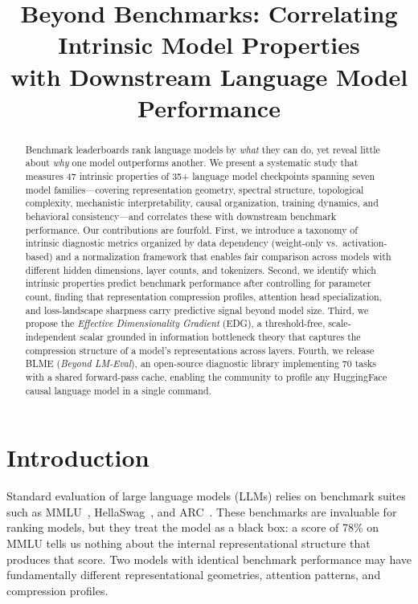 \documentclass{article}
\title{Beyond Benchmarks: Correlating Intrinsic Model Properties\\with Downstream Language Model Performance}
\author{
}
\begin{document}
\maketitle

\begin{abstract}
Benchmark leaderboards rank language models by \emph{what} they can do, yet reveal little about \emph{why} one model outperforms another.
We present a systematic study that measures 47 intrinsic properties of 35+ language model checkpoints spanning seven model families---covering representation geometry, spectral structure, topological complexity, mechanistic interpretability, causal organization, training dynamics, and behavioral consistency---and correlates these with downstream benchmark performance.
Our contributions are fourfold.
First, we introduce a taxonomy of intrinsic diagnostic metrics organized by data dependency (weight-only vs.\ activation-based) and a normalization framework that enables fair comparison across models with different hidden dimensions, layer counts, and tokenizers.
Second, we identify which intrinsic properties predict benchmark performance after controlling for parameter count, finding that representation compression profiles, attention head specialization, and loss-landscape sharpness carry predictive signal beyond model size.
Third, we propose the \emph{Effective Dimensionality Gradient} (EDG), a threshold-free, scale-independent scalar grounded in information bottleneck theory that captures the compression structure of a model's representations across layers.
Fourth, we release BLME (\emph{Beyond LM-Eval}), an open-source diagnostic library implementing 70 tasks with a shared forward-pass cache, enabling the community to profile any HuggingFace causal language model in a single command.
\end{abstract}

\section{Introduction}
\label{sec:introduction}

Standard evaluation of large language models (LLMs) relies on benchmark suites such as MMLU~\citep{hendrycks2021measuring}, HellaSwag~\citep{zellers2019hellaswag}, and ARC~\citep{clark2018arc}.
These benchmarks are invaluable for ranking models, but they treat the model as a black box: a score of 78\% on MMLU tells us nothing about the internal representational structure that produces that score.
Two models with identical benchmark performance may have fundamentally different representational geometries, attention patterns, and compression profiles.
\end{document}
